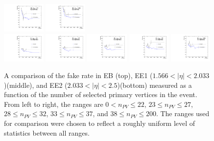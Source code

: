 \begin{figure}[!htbp]
\includegraphics[width=0.19\textwidth]{fig/compare_pv_EE1_2017_33to37.pdf}
\includegraphics[width=0.19\textwidth]{fig/compare_pv_EE1_2017_38to200.pdf}\\
\includegraphics[width=0.19\textwidth]{fig/compare_pv_EE2_2017_0to22.pdf}
\includegraphics[width=0.19\textwidth]{fig/compare_pv_EE2_2017_23to27.pdf}
\includegraphics[width=0.19\textwidth]{fig/compare_pv_EE2_2017_28to32.pdf}
\includegraphics[width=0.19\textwidth]{fig/compare_pv_EE2_2017_33to37.pdf}
\includegraphics[width=0.19\textwidth]{fig/compare_pv_EE2_2017_38to200.pdf}
\caption{A comparison of the fake rate in EB (top), EE1 ($1.566 < |\eta| < 2.033$)(middle), and EE2 ($2.033 < \lvert \eta \rvert< 2.5$)(bottom) measured as a function of the number of selected primary vertices in the event. From left to right, the ranges are $0 < n_{PV} \leq 22$, $23 \leq n_{PV} \leq 27$, $28 \leq n_{PV} \leq 32$,  $33 \leq n_{PV} \leq 37$, and  $38 \leq n_{PV} \leq 200$. The ranges used for comparison were chosen to reflect a roughly uniform level of statistics between all ranges.}
\label{fig:frpileup_compare_dataset_2017}
\end{figure}

